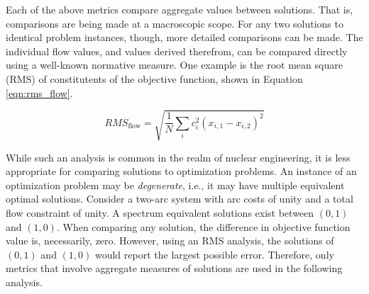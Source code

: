 Each of the above metrics compare aggregate values between solutions. That is,
comparisons are being made at a macroscopic scope. For any two solutions to
identical problem instances, though, more detailed comparisons can be made. The
individual flow values, and values derived therefrom, can be compared directly
using a well-known normative measure. One example is the root mean square (RMS)
of constitutents of the objective function, shown in Equation
\ref{eqn:rms_flow}.

\begin{equation}\label{eqn:rms_flow}
RMS_{\text{flow}} = \sqrt{ \frac{1}{N} \sum_i c_i^2 (x_{i, 1} - x_{i, 2}) ^2 }
\end{equation}

While such an analysis is common in the realm of nuclear engineering, it is less
appropriate for comparing solutions to optimization problems. An instance of an
optimization problem may be \textit{degenerate}, i.e., it may have multiple
equivalent optimal solutions. Consider a two-arc system with arc costs of unity
and a total flow constraint of unity. A spectrum equivalent solutions exist
between $(0, 1)$ and $(1, 0)$. When comparing any solution, the difference in
objective function value is, necessarily, zero. However, using an RMS analysis,
the solutions of $(0, 1)$ and $(1, 0)$ would report the largest possible
error. Therefore, only metrics that involve aggregate measures of solutions are
used in the following analysis.
